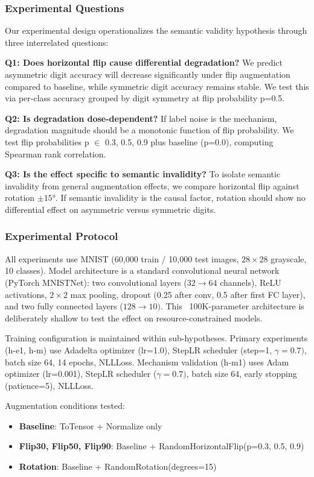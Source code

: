 
\subsubsection{Experimental Questions}

Our experimental design operationalizes the semantic validity hypothesis through three interrelated questions:

\textbf{Q1: Does horizontal flip cause differential degradation?} We predict asymmetric digit accuracy will decrease significantly under flip augmentation compared to baseline, while symmetric digit accuracy remains stable. We test this via per-class accuracy grouped by digit symmetry at flip probability p=0.5.

\textbf{Q2: Is degradation dose-dependent?} If label noise is the mechanism, degradation magnitude should be a monotonic function of flip probability. We test flip probabilities p $\in$ {0.3, 0.5, 0.9} plus baseline (p=0.0), computing Spearman rank correlation.

\textbf{Q3: Is the effect specific to semantic invalidity?} To isolate semantic invalidity from general augmentation effects, we compare horizontal flip against rotation $\pm 15$°. If semantic invalidity is the causal factor, rotation should show no differential effect on asymmetric versus symmetric digits.

\subsubsection{Experimental Protocol}

All experiments use MNIST (60,000 train / 10,000 test images, $28\times 28$ grayscale, 10 classes). Model architecture is a standard convolutional neural network (PyTorch MNISTNet): two convolutional layers ($32\rightarrow 64$ channels), ReLU activations, $2\times 2$ max pooling, dropout (0.25 after conv, 0.5 after first FC layer), and two fully connected layers ($128\rightarrow 10)$. This ~100K-parameter architecture is deliberately shallow to test the effect on resource-constrained models.

Training configuration is maintained within sub-hypotheses. Primary experiments (h-e1, h-m) use Adadelta optimizer (lr=1.0), StepLR scheduler (step=1, $\gamma =0.7)$, batch size 64, 14 epochs, NLLLoss. Mechanism validation (h-m1) uses Adam optimizer (lr=0.001), StepLR scheduler ($\gamma =0.7)$, batch size 64, early stopping (patience=5), NLLLoss.

Augmentation conditions tested:
\begin{itemize}
\item \textbf{Baseline}: ToTensor + Normalize only
\item \textbf{Flip30, Flip50, Flip90}: Baseline + RandomHorizontalFlip(p={0.3, 0.5, 0.9})
\item \textbf{Rotation}: Baseline + RandomRotation(degrees=15)
\end{itemize}

